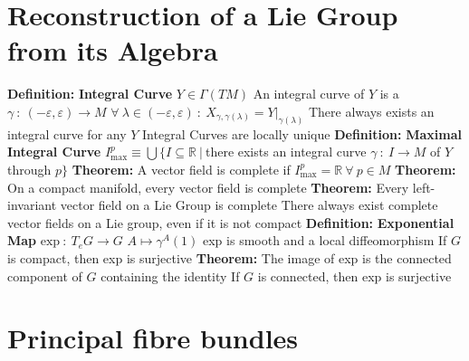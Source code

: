 \documentclass[14pt]{extarticle}
\def\Definition{{\color{blue} \textbf{Definition:} }}
\def\Theorem{{\color{red} \textbf{Theorem:} }}
\begin{document}
\begin{outline}
	\section*{Reconstruction of a Lie Group from its Algebra}
		\1	\Definition \textbf{Integral Curve}
			\2	$Y \in \Gamma(TM)$
			\2	An integral curve of $Y$ is a $\gamma~:~(-\varepsilon,\varepsilon) \rightarrow M$
			\2	$\forall~\lambda \in (-\varepsilon,\varepsilon)~:~X_{\gamma,\gamma(\lambda)} = Y|_{\gamma(\lambda)}$
			\2	There always exists an integral curve for any $Y$
			\2	Integral Curves are locally unique
		\1	\Definition \textbf{Maximal Integral Curve}
			\2	$I^p_{\text{max}} \equiv \bigcup\{I \subseteq \mathbb{R}~|~$there 
					exists an integral curve $\gamma~:~I \rightarrow M$ of $Y$ through $p\}$
		\1	\Theorem A vector field is complete if $I_{\text{max}}^p = \mathbb{R}~\forall~p \in M$
		\1	\Theorem On a compact manifold, every vector field is complete
		\1	\Theorem Every left-invariant vector field on a Lie Group is complete
			\2	There always exist complete vector fields on a Lie group, even if 
					it is not compact
		\1	\Definition \textbf{Exponential Map}
			\2	$\text{exp}~:~T_eG \rightarrow G$
			\2	$A \mapsto \gamma^A(1)$
			\2	exp is smooth and a local diffeomorphism
			\2	If $G$ is compact, then exp is surjective
		\1	\Theorem The image of exp is the connected component
				of $G$ containing the identity
			\2	If $G$ is connected, then exp is surjective
	
	\section{Principal fibre bundles}
	\end{outline}
\end{document}
